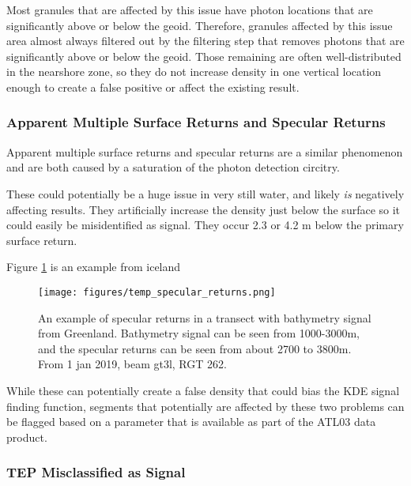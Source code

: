 Most granules that are affected by this issue have photon locations that are significantly above or below the geoid. Therefore, granules affected by this issue area almost always filtered out by the filtering step that removes photons that are significantly above or below the geoid. Those remaining are often well-distributed in the nearshore zone, so they do not increase density in one vertical location enough to create a false positive or affect the existing result. 

\subsubsection{Apparent Multiple Surface Returns and Specular Returns}

Apparent multiple surface returns and specular returns are a similar phenomenon and are both caused by a saturation of the photon detection circitry. 

These could potentially be a huge issue in very still water, and likely \emph{is} negatively affecting results. They artificially increase the density just below the surface so it could easily be misidentified as signal. They occur 2.3 or 4.2 m below the primary surface return.

Figure \ref{fig:multiple-surf-returns} is an example from iceland 

\begin{figure}[h!]
    \centering
    \texttt{[image: figures/temp\_specular\_returns.png]}
    \caption{An example of specular returns in a transect with bathymetry signal from Greenland. Bathymetry signal can be seen from 1000-3000m, and the specular returns can be seen from about 2700 to 3800m. From 1 jan 2019, beam gt3l, RGT 262.}
    \label{fig:multiple-surf-returns}
\end{figure}

While these can potentially create a false density that could bias the KDE signal finding function, segments that potentially are affected by these two problems can be flagged based on a parameter that is available as part of the ATL03 data product. 

\subsubsection{TEP Misclassified as Signal}

